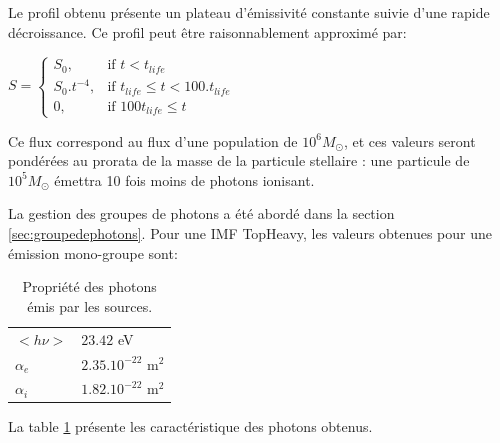 Le profil obtenu présente un plateau d'émissivité constante suivie d'une rapide décroissance.
Ce profil peut être raisonnablement approximé par:

$
    S = 
\begin{cases}
    S_0 ,         & \text{if } t < t_{life}\\
    S_0.t^{-4},   & \text{if } t_{life} \leq t < 100.t_{life} \\
    0,   & \text{if } 100t_{life} \leq t
\end{cases}
$

Ce flux correspond au flux d'une population de $10^6M_\odot$, et ces valeurs seront pondérées au prorata de la masse de la particule stellaire : une particule de $10^5M_\odot$ émettra 10 fois moins de photons ionisant.

La gestion des groupes de photons a été abordé dans la section \ref{sec:groupedephotons}.
Pour une IMF TopHeavy, les valeurs obtenues pour une émission mono-groupe sont:

\begin{table}
\begin{tabular}{l l }
	$<h\nu>$	&  $23.42$ eV \\
	$\alpha_e$	&  $2.35.10^{-22}$ m$^2$ \\
	$\alpha_i$	&  $1.82.10^{-22}$ m$^2$ \\
\end{tabular}
\caption{Propriété des photons émis par les sources.
\label{tab_photon}}
\end{table}

La table \ref{tab_photon} présente les caractéristique des photons obtenus.






%


